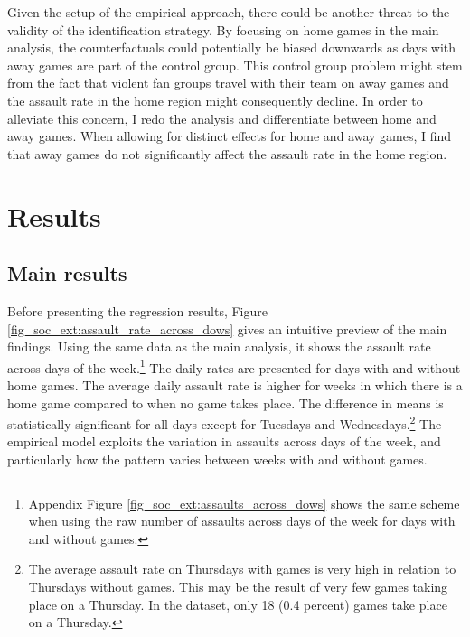 Given the setup of the empirical approach, there could be another threat to the validity of the identification strategy. By focusing on home games in the main analysis, the counterfactuals could potentially be biased downwards as days with away games are part of the control group. This control group problem might stem from the fact that violent fan groups travel with their team on away games and the assault rate in the home region might consequently decline. In order to alleviate this concern, I redo the analysis and differentiate between home and away games. When allowing for distinct effects for home and away games, I find that away games do not significantly affect the assault rate in the home region. 









\bigskip
\section{Results}\label{sec_soc_ext:results}



\subsection{Main results}



Before presenting the regression results, Figure \ref{fig_soc_ext:assault_rate_across_dows} gives an intuitive preview of the main findings. Using the same data as the main analysis, it shows the assault rate across days of the week.\footnote{Appendix Figure \ref{fig_soc_ext:assaults_across_dows} shows the same scheme when using the raw number of assaults across days of the week for days with and without games.} The daily rates are presented for days with and without home games. The average daily assault rate is higher for weeks in which there is a home game compared to when no game takes place. The difference in means is statistically significant for all days except for Tuesdays and Wednesdays.\footnote{The average assault rate on Thursdays with games is very high in relation to Thursdays without games. This may be the result of very few games taking place on a Thursday. In the dataset, only 18 (0.4 percent) games take place on a Thursday.} The empirical model exploits the variation in assaults across days of the week, and particularly how the pattern varies between weeks with and without games.


